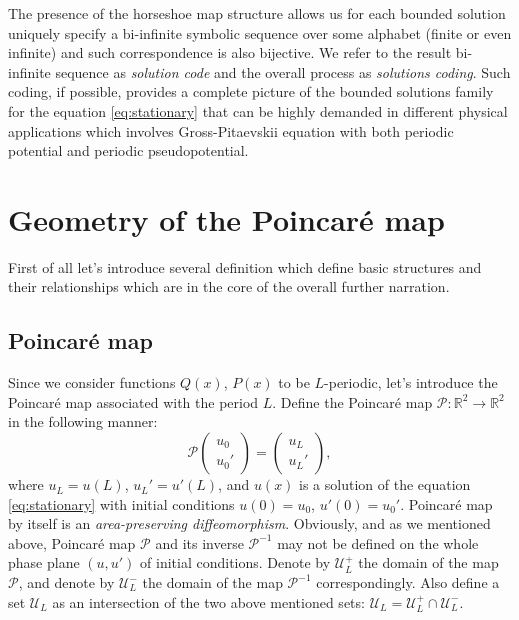The presence of the horseshoe map structure allows us for each bounded solution uniquely specify a bi-infinite symbolic sequence over some alphabet (finite or even infinite) and such correspondence is also bijective.
We refer to the result bi-infinite sequence as {\it solution code} and the overall process as {\it solutions coding}.
Such coding, if possible, provides a complete picture of the bounded solutions family for the equation \eqref{eq:stationary} that can be highly demanded in different physical applications which involves Gross-Pitaevskii equation with both periodic potential and periodic pseudopotential.

\section{Geometry of the Poincar\'e map}

First of all let's introduce several definition which define basic structures and their relationships which are in the core of the overall further narration.

\subsection{Poincar\'e map}

Since we consider functions $Q(x)$, $P(x)$ to be $L$-periodic, let's introduce the Poincar\'e map associated with the period $L$.
Define the Poincar\'e map $\mathcal{P}: \mathbb{R}^2 \to \mathbb{R}^2$ in the following manner:
\begin{equation}
	\mathcal{P} \begin{pmatrix} u_0 \\ u_0' \end{pmatrix}
	= \begin{pmatrix} u_L \\ u_L' \end{pmatrix},
\end{equation}
where $u_L = u(L)$, $u_L' = u'(L)$, and $u(x)$ is a solution of the equation \eqref{eq:stationary} with initial conditions $u(0) = u_0$, $u'(0) = u_0'$.
Poincar\'e map by itself is an {\it area-preserving diffeomorphism}.
Obviously, and as we mentioned above, Poincar\'e map $\mathcal{P}$ and its inverse $\mathcal{P}^{-1}$ may not be defined on the whole phase plane $(u, u')$ of initial conditions.
Denote by $\mathscr{U}_L^+$ the domain of the map $\mathcal{P}$, and denote by $\mathscr{U}_L^-$ the domain of the map $\mathcal{P}^{-1}$ correspondingly.
Also define a set $\mathscr{U}_L$ as an intersection of the two above mentioned sets: $\mathscr{U}_L = \mathscr{U}_L^+ \cap \mathscr{U}_L^-$.

